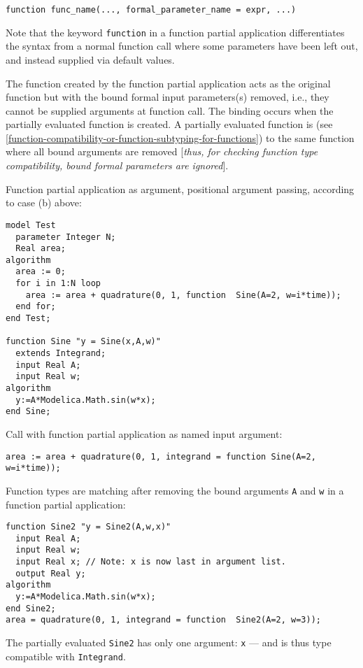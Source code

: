 \begin{lstlisting}[language=modelica]
  function func_name(..., formal_parameter_name = expr, ...)
\end{lstlisting}

\begin{nonnormative}
Note that the keyword \lstinline!function! in a function partial
application differentiates the syntax from a normal function call
where some parameters have been left out, and instead supplied via
default values.
\end{nonnormative}

The function created by the function partial application acts as the
original function but with the bound formal input parameters(s) removed,
i.e., they cannot be supplied arguments at function call. The binding
occurs when the partially evaluated function is created. A partially
evaluated function is  (see \autoref{function-compatibility-or-function-subtyping-for-functions}) to the
same function where all bound arguments are removed {[}\emph{thus, for
checking function type compatibility, bound formal parameters are
ignored}{]}.

\begin{example}
Function partial application as argument, positional argument passing, according to case (b) above:
\begin{lstlisting}[language=modelica]
model Test
  parameter Integer N;
  Real area;
algorithm
  area := 0;
  for i in 1:N loop
    area := area + quadrature(0, 1, function  Sine(A=2, w=i*time));
  end for;
end Test;

function Sine "y = Sine(x,A,w)"
  extends Integrand;
  input Real A;
  input Real w;
algorithm
  y:=A*Modelica.Math.sin(w*x);
end Sine;
\end{lstlisting}
Call with function partial application as named input argument:
\begin{lstlisting}[language=modelica]
area := area + quadrature(0, 1, integrand = function Sine(A=2, w=i*time));
\end{lstlisting}
\end{example}

\begin{example}
Function types are matching after removing the bound arguments \lstinline!A! and \lstinline!w! in a function partial
application:
\begin{lstlisting}[language=modelica]
  function Sine2 "y = Sine2(A,w,x)"
  input Real A;
  input Real w;
  input Real x; // Note: x is now last in argument list.
  output Real y;
algorithm
  y:=A*Modelica.Math.sin(w*x);
end Sine2;
area = quadrature(0, 1, integrand = function  Sine2(A=2, w=3));
\end{lstlisting}
The partially evaluated \lstinline!Sine2! has only one argument: \lstinline!x! ---
and is thus type compatible with \lstinline!Integrand!.
\end{example}

